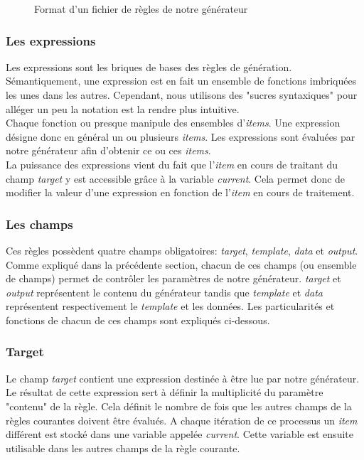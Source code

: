 		\begin{figure}[!]
			\centering
			
			\caption{Format d'un fichier de règles de notre générateur}
			\label{fig:rule:format}
		\end{figure}
		
	\subsubsection*{Les expressions}
	
		Les expressions sont les briques de bases des règles de génération. Sémantiquement, une expression est en fait un ensemble de fonctions imbriquées les unes dans les autres. Cependant, nous utilisons des "sucres syntaxiques" pour alléger un peu la notation est la rendre plus intuitive.\\
		
		Chaque fonction ou presque manipule des ensembles d'\textit{items}. Une expression désigne donc en général un ou plusieurs \textit{items}. Les expressions sont évaluées par notre générateur afin d'obtenir ce ou ces \textit{items}.\\
		
		La puissance des expressions vient du fait que l'\textit{item} en cours de traitant du champ \textit{target} y est accessible grâce à la variable \textit{current}. Cela permet donc de modifier la valeur d'une expression en fonction de l'\textit{item} en cours de traitement.
	
	\subsubsection*{Les champs}
		Ces règles possèdent quatre champs obligatoires: \textit{target}, \textit{template}, \textit{data} et \textit{output}. Comme expliqué dans la précédente section, chacun de ces champs (ou ensemble de champs) permet de  contrôler les paramètres de notre générateur. \textit{target} et \textit{output} représentent le contenu du générateur tandis que \textit{template} et \textit{data} représentent respectivement le \textit{template} et les données. Les particularités et fonctions de chacun de ces champs sont expliqués ci-dessous.
		
		
		\subsubsection*{Target}
			Le champ \textit{target} contient une expression destinée à être lue par notre générateur. Le résultat de cette expression sert à définir la multiplicité du paramètre "contenu" de la règle. Cela définit le nombre de fois que les autres champs de la règles courantes doivent être évalués. A chaque itération de ce processus un \textit{item} différent est stocké dans une variable appelée \textit{current}. Cette variable est ensuite utilisable dans les autres champs de la règle courante.
		
